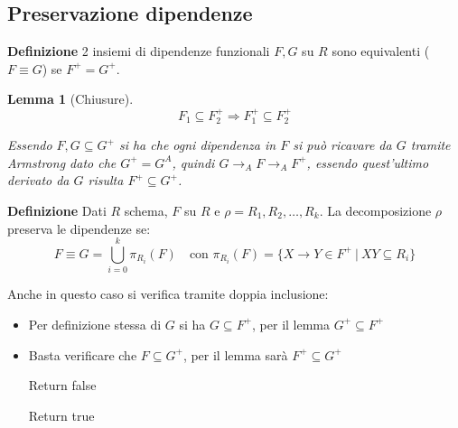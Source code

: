 \documentclass{article}
\newtheorem{lemma}[theorem]{Lemma}
\begin{document}
\subsection{Preservazione dipendenze}

\textbf{Definizione} 2 insiemi di dipendenze funzionali $F,G$ su $R$ sono equivalenti ($F\equiv G$) se $F^+=G^+$.\newline

\begin{lemma}[Chiusure]
    $$F_1\subseteq F_2^+\Rightarrow F_1^+\subseteq F_2^+$$

    \noindent Essendo $F,G\subseteq G^+$ si ha che ogni dipendenza in $F$ si può ricavare da $G$ tramite Armstrong dato che $G^+=G^A$, quindi $G\rightarrow_A F\rightarrow_A F^+$, essendo quest'ultimo derivato da $G$ risulta $F^+\subseteq G^+$.\newline
    
\end{lemma}

\noindent\textbf{Definizione} Dati $R$ schema, $F$ su $R$ e $\rho=R_1,R_2,\ldots,R_k$. La decomposizione $\rho$ preserva le dipendenze se:
$$F\equiv G=\bigcup_{i=0}^k\pi_{R_i}(F)\ \ \ \text{ con }\pi_{R_i}(F)=\{X\rightarrow Y\in F^+\ |\ XY\subseteq R_i\}$$

\noindent Anche in questo caso si verifica tramite doppia inclusione:
\begin{itemize}
    \item Per definizione stessa di $G$ si ha $G\subseteq F^+$, per il lemma $G^+\subseteq F^+$
    \item Basta verificare che $F\subseteq G^+$, per il lemma sarà $F^+\subseteq G^+$

        \begin{algorithm}[H]
            \caption{$F\subseteq G^+$}
            \begin{algorithmic}


                        \State Return false

                    \EndIf
    
                \EndFor

                \State Return true
                
            \end{algorithmic}
        \end{algorithm}
    
\end{itemize}
\end{document}
